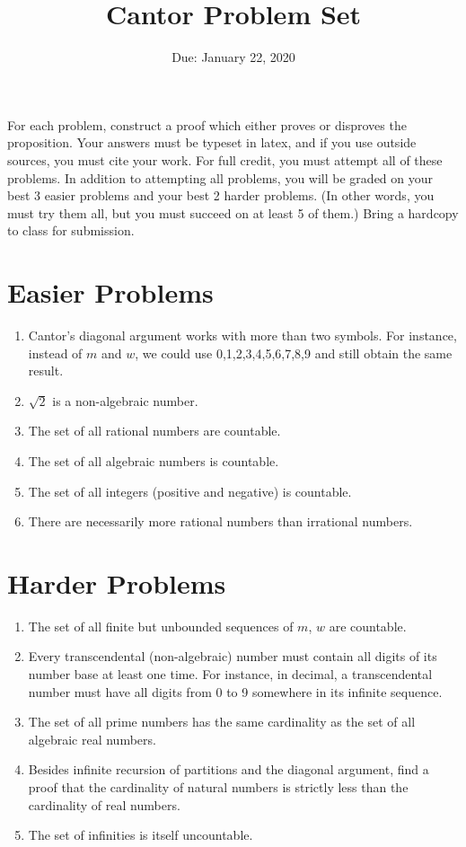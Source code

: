 \documentclass{article}
\title{Cantor Problem Set}
\date{Due: January 22, 2020}
\begin{document}
\maketitle

For each problem, construct a proof which either proves or disproves
the proposition.  Your answers must be typeset in latex, and if you use
outside sources, you must cite your work.  For full credit, you must
attempt all of these problems.  In addition to attempting all problems,
you will be graded on your best 3 easier problems and your best
2 harder problems.  (In other words, you must try them all, but you
must succeed on at least 5 of them.) Bring a hardcopy to class for
submission.

\section*{Easier Problems}
\begin{enumerate}
    \item Cantor's diagonal argument works with more than two symbols.
        For instance, instead of $m$ and $w$, we could use
        0,1,2,3,4,5,6,7,8,9 and still obtain the same result.
    \item $\sqrt{2}$ is a non-algebraic number.
    \item The set of all rational numbers are countable.
    \item The set of all algebraic numbers is countable.
    \item The set of all integers (positive and negative) is
        countable.
    \item There are necessarily more rational numbers than irrational
        numbers.
\end{enumerate}

\section*{Harder Problems}
\begin{enumerate}
    \item The set of all finite but unbounded sequences of $m$, $w$
        are countable.
    \item Every transcendental (non-algebraic) number must contain all
        digits of its number base at least one time.  For instance, in
        decimal, a transcendental number must have all digits from 0 to
        9 somewhere in its infinite sequence.
    \item The set of all prime numbers has the same cardinality as the
        set of all algebraic real numbers.
    \item Besides infinite recursion of partitions and the diagonal argument,
        find a proof that the cardinality of natural numbers is strictly
        less than the cardinality of real numbers.
    \item The set of infinities is itself uncountable.
\end{enumerate}
\end{document}
